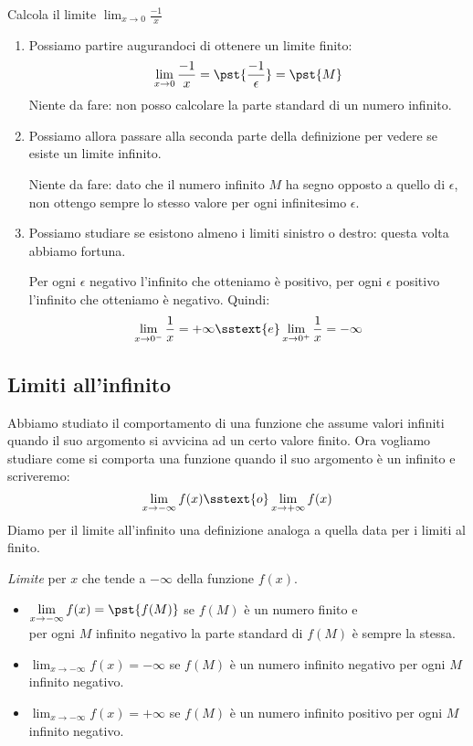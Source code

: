 \begin{esempio}
Calcola il limite \(\displaystyle \lim_{x \to 0}\frac{-1}{x}\)
\begin{enumerate} %
\item 
Possiamo partire augurandoci di ottenere un limite finito:
\[\lim_{x \to 0}\frac{-1}{x} = \pst{\frac{-1}{\epsilon}} = \pst{M}\]
Niente da fare: non posso calcolare la parte standard di un numero infinito.
\item 
Possiamo allora passare alla seconda parte della definizione per vedere se 
esiste un limite infinito. 

Niente da fare: dato che il numero infinito \(M\) ha segno opposto a 
quello di \(\epsilon\), non ottengo sempre lo stesso valore per ogni 
infinitesimo \(\epsilon\).
\item 
Possiamo studiare se esistono almeno i limiti sinistro o destro: 
questa volta abbiamo fortuna. 

Per ogni \(\epsilon\) negativo l'infinito che 
otteniamo è positivo, per ogni \(\epsilon\) positivo l'infinito che 
otteniamo è negativo. Quindi:
\[\lim_{x \to 0^-}\frac{1}{x} = +\infty \sstext{e} 
\lim_{x \to 0^+}\frac{1}{x} = -\infty\]
\end{enumerate}
\end{esempio}


\subsection{Limiti all'infinito}
\label{subsec:cont_limiti_allinfinito}


Abbiamo studiato il comportamento di una funzione che 
assume valori infiniti quando il suo argomento si avvicina ad un certo 
valore finito. 
Ora vogliamo studiare come si comporta una funzione quando il suo argomento 
è un infinito e scriveremo: 
\[\lim_{x \to -\infty} f(x) \sstext{o} \lim_{x \to +\infty} f(x)\]
Diamo per il limite all'infinito una definizione analoga a quella 
data per i limiti al finito.

\begin{definizione}
\emph{Limite} per \(x\) che tende a \(-\infty\) della funzione \(f(x)\).
\begin{itemize}
\item 
\(\displaystyle \lim_{x \to -\infty}f(x) = \pst{f(M)}\)
se \(f(M)\) è un numero finito e \\
per ogni \(M\) infinito negativo
la parte standard di \(f(M)\) è sempre la stessa.
\item 
\(\displaystyle \lim_{x \to -\infty}f(x) = -\infty\)
se \(f(M)\) è un numero infinito negativo 
per ogni \(M\) infinito negativo.
\item 
\(\displaystyle \lim_{x \to -\infty}f(x) = +\infty\)
se \(f(M)\) è un numero infinito positivo 
per ogni \(M\) infinito negativo.
\end{itemize}
\end{definizione}

